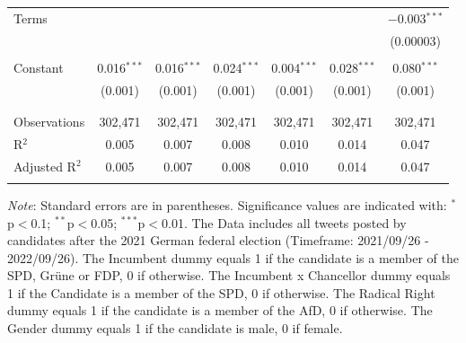 \documentclass[a4paper,11pt]{article}
\begin{document}
\begin{table}[H]
\begin{tabular}{@{\extracolsep{5pt}}lcccccc}
 Terms &  &  &  &  &  & $-$0.003$^{***}$ \\ 
  &  &  &  &  &  & (0.00003) \\ 
  & & & & & & \\ 
 Constant & 0.016$^{***}$ & 0.016$^{***}$ & 0.024$^{***}$ & 0.004$^{***}$ & 0.028$^{***}$ & 0.080$^{***}$ \\ 
  & (0.001) & (0.001) & (0.001) & (0.001) & (0.001) & (0.001) \\ 
  & & & & & & \\ 
\hline \\[-1.8ex] 
Observations & 302,471 & 302,471 & 302,471 & 302,471 & 302,471 & 302,471 \\ 
R$^{2}$ & 0.005 & 0.007 & 0.008 & 0.010 & 0.014 & 0.047 \\ 
Adjusted R$^{2}$ & 0.005 & 0.007 & 0.008 & 0.010 & 0.014 & 0.047 \\ 
\hline 
\hline \\[-1.8ex] 
\end{tabular} 
\endgroup 
\vspace{0.5em} %
    \begin{minipage}{0.95\linewidth}
    \scriptsize
    \textit{Note}: Standard errors are in parentheses. Significance values are indicated with: $^*$p$<$0.1; $^{**}$p$<$0.05;
    $^{***}$p$<$0.01.
    The Data includes all tweets posted by candidates after the 2021 German federal election (Timeframe: 2021/09/26 - 2022/09/26).
    The Incumbent dummy equals 1 if the candidate is a member of the SPD, Grüne or FDP, 0 if otherwise. The Incumbent x Chancellor dummy
    equals 1 if the Candidate is a member of the SPD, 0 if otherwise. The Radical Right dummy equals 1 if the candidate is a
    member of the AfD, 0 if otherwise. The Gender dummy equals 1 if the candidate is male, 0 if female.
    \end{minipage}
    \end{table}\vspace{-.8cm}
\end{document}
